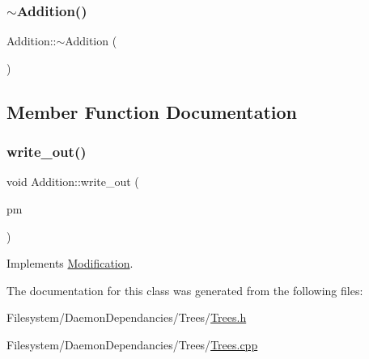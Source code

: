 \mbox{\label{class_addition_a66f0b31feefaaa51701e78b2a366b840}} 
\subsubsection{\texorpdfstring{$\sim$\+Addition()}{~Addition()}}
{\footnotesize\ttfamily Addition\+::$\sim$\+Addition (\begin{DoxyParamCaption}{ }\end{DoxyParamCaption})}



\subsection{Member Function Documentation}
\mbox{\label{class_addition_a08cd2dae96a62c80d6fe62339232fbca}} 
\subsubsection{\texorpdfstring{write\+\_\+out()}{write\_out()}}
{\footnotesize\ttfamily void Addition\+::write\+\_\+out (\begin{DoxyParamCaption}\item[{\mbox{\hyperlink{class_partition_manager}{Partition\+Manager}} $\ast$}]{pm }\end{DoxyParamCaption})\hspace{0.3cm}{\ttfamily [virtual]}}



Implements \mbox{\hyperlink{class_modification_a50d1fd809524902d2a1e78d02f4be1dc}{Modification}}.



The documentation for this class was generated from the following files\+:\begin{DoxyCompactItemize}
\item 
Filesystem/\+Daemon\+Dependancies/\+Trees/\mbox{\hyperlink{_trees_8h}{Trees.\+h}}\item 
Filesystem/\+Daemon\+Dependancies/\+Trees/\mbox{\hyperlink{_trees_8cpp}{Trees.\+cpp}}\end{DoxyCompactItemize}
